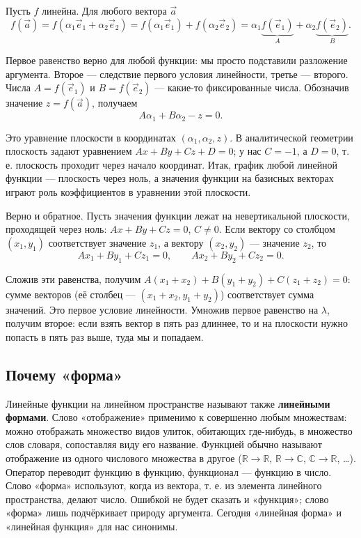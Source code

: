 \documentclass[11pt,a4paper]{article}
\begin{document}
Пусть $f$ линейна. Для любого вектора $\vec a$
\[
f(\vec a) = f(\alpha_1 \vec e_1 + \alpha_2 \vec e_2) = f(\alpha_1 \vec e_1) + f(\alpha_2 \vec e_2) = \alpha_1 \underbrace{f(\vec e_1)}_{A} + \alpha_2 \underbrace{f(\vec e_2)}_{B}.
\]

Первое равенство верно для любой функции: мы просто подставили разложение аргумента. Второе — следствие первого условия линейности, третье — второго. Числа $A = f(\vec e_1)$ и $B = f(\vec e_2)$ — какие-то фиксированные числа. Обозначив значение $z = f(\vec a)$, получаем
\[
A \alpha_1 + B \alpha_2 - z = 0.
\]

Это уравнение плоскости в координатах $(\alpha_1, \alpha_2, z)$. В аналитической геометрии плоскость задают уравнением $Ax + By + Cz + D = 0$; у нас $C = -1$, а $D = 0$, т. е. плоскость проходит через начало координат. Итак, график любой линейной функции — плоскость через ноль, а значения функции на базисных векторах играют роль коэффициентов в уравнении этой плоскости.

Верно и обратное. Пусть значения функции лежат на невертикальной плоскости, проходящей через ноль: $Ax + By + Cz = 0$, $C \neq 0$. Если вектору со столбцом $(x_1, y_1)$ соответствует значение $z_1$, а вектору $(x_2, y_2)$ — значение $z_2$, то
\[
A x_1 + B y_1 + C z_1 = 0, \qquad A x_2 + B y_2 + C z_2 = 0.
\]

Сложив эти равенства, получим $A(x_1 + x_2) + B(y_1 + y_2) + C(z_1 + z_2) = 0$: сумме векторов (её столбец — $(x_1 + x_2, y_1 + y_2)$) соответствует сумма значений. Это первое условие линейности. Умножив первое равенство на $\lambda$, получим второе: если взять вектор в пять раз длиннее, то и на плоскости нужно попасть в пять раз выше, туда мы и попадаем.

\subsection{Почему «форма»}

Линейные функции на линейном пространстве называют также \textbf{линейными формами}. Слово «отображение» применимо к совершенно любым множествам: можно отображать множество видов улиток, обитающих где-нибудь, в множество слов словаря, сопоставляя виду его название. Функцией обычно называют отображение из одного числового множества в другое ($\mathbb{R} \to \mathbb{R}$, $\mathbb{R} \to \mathbb{C}$, $\mathbb{C} \to \mathbb{R}$, …). Оператор переводит функцию в функцию, функционал — функцию в число. Слово «форма» используют, когда из вектора, т. е. из элемента линейного пространства, делают число. Ошибкой не будет сказать и «функция»; слово «форма» лишь подчёркивает природу аргумента. Сегодня «линейная форма» и «линейная функция» для нас синонимы.
\end{document}
